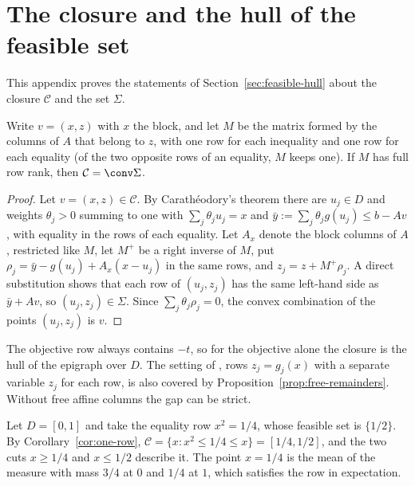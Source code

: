 \section{The closure and the hull of the feasible set}\label{app:feasible-hull}

This appendix proves the statements of Section~\ref{sec:feasible-hull} about
the closure $\mathcal C$ and the set $\Sigma$.

\begin{proposition}\label{prop:free-remainders}
Write $v=(x,z)$ with $x$ the block, and let $M$ be the matrix formed by the
columns of $A$ that belong to $z$, with one row for each inequality and one
row for each equality (of the two opposite rows of an equality, $M$ keeps one).
If $M$ has full row rank, then $\mathcal C=\conv\Sigma$.
\end{proposition}

\begin{proof}
Let $v=(x,z)\in\mathcal C$. By Carath\'eodory's theorem there are $u_j\in D$ and
weights $\theta_j>0$ summing to one with $\sum_j\theta_ju_j=x$ and
$\bar y:=\sum_j\theta_jg(u_j)\le b-Av$, with equality in the rows of each
equality. Let $A_x$ denote the block columns of $A$, restricted like $M$, let
$M^+$ be a right inverse of $M$, put $\rho_j=\bar y-g(u_j)+A_x(x-u_j)$ in the
same rows, and $z_j=z+M^+\rho_j$. A direct substitution shows that each row
of $(u_j,z_j)$ has the same left-hand side as $\bar y+Av$, so
$(u_j,z_j)\in\Sigma$. Since $\sum_j\theta_j\rho_j=0$, the convex combination of
the points $(u_j,z_j)$ is $v$.
\end{proof}

The objective row always contains $-t$, so for the objective alone the
closure is the hull of the epigraph over $D$. The setting of
\citet{LiersEtAl2021}, rows $z_j=g_j(x)$ with a separate variable $z_j$ for
each row, is also covered by Proposition~\ref{prop:free-remainders}. Without
free affine columns the gap can be strict.

\begin{example}\label{ex:quarter}
Let $D=[0,1]$ and take the equality row $x^2=1/4$, whose feasible set is
$\{1/2\}$. By Corollary~\ref{cor:one-row}, $\mathcal C=\{x:x^2\le1/4\le x\}=[1/4,1/2]$,
and the two cuts $x\ge1/4$ and $x\le1/2$ describe it. The point $x=1/4$ is the
mean of the measure with mass $3/4$ at $0$ and $1/4$ at $1$, which satisfies
the row in expectation.
\end{example}

